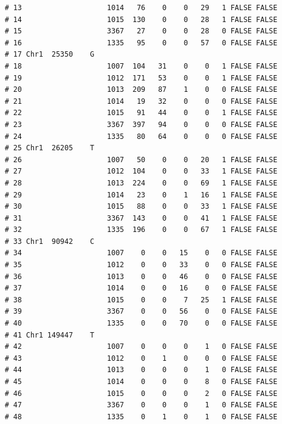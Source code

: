 \documentclass{article}\usepackage[]{graphicx}\usepackage[]{color}
\makeatletter
\newenvironment{kframe}{%
 \def\at@end@of@kframe{}%
 \ifinner\ifhmode%
  \def\at@end@of@kframe{\end{minipage}}%
  \begin{minipage}{\columnwidth}%
 \fi\fi%
 \def\FrameCommand##1{\hskip\@totalleftmargin \hskip-\fboxsep
 \colorbox{shadecolor}{##1}\hskip-\fboxsep
     \hskip-\linewidth \hskip-\@totalleftmargin \hskip\columnwidth}%
 \MakeFramed {\advance\hsize-\width
   \@totalleftmargin\z@ \linewidth\hsize
   \@setminipage}}%
 {\par\unskip\endMakeFramed%
 \at@end@of@kframe}
\newenvironment{knitrout}{}{} %
\makeatother
\begin{document}
\begin{knitrout}
\begin{kframe}
\begin{verbatim}
# 13                    1014   76    0    0   29   1 FALSE FALSE        
# 14                    1015  130    0    0   28   1 FALSE FALSE        
# 15                    3367   27    0    0   28   0 FALSE FALSE        
# 16                    1335   95    0    0   57   0 FALSE FALSE        
# 17 Chr1  25350    G                                                   
# 18                    1007  104   31    0    0   1 FALSE FALSE        
# 19                    1012  171   53    0    0   1 FALSE FALSE        
# 20                    1013  209   87    1    0   0 FALSE FALSE        
# 21                    1014   19   32    0    0   0 FALSE FALSE        
# 22                    1015   91   44    0    0   1 FALSE FALSE        
# 23                    3367  397   94    0    0   0 FALSE FALSE        
# 24                    1335   80   64    0    0   0 FALSE FALSE        
# 25 Chr1  26205    T                                                   
# 26                    1007   50    0    0   20   1 FALSE FALSE        
# 27                    1012  104    0    0   33   1 FALSE FALSE        
# 28                    1013  224    0    0   69   1 FALSE FALSE        
# 29                    1014   23    0    1   16   1 FALSE FALSE        
# 30                    1015   88    0    0   33   1 FALSE FALSE        
# 31                    3367  143    0    0   41   1 FALSE FALSE        
# 32                    1335  196    0    0   67   1 FALSE FALSE        
# 33 Chr1  90942    C                                                   
# 34                    1007    0    0   15    0   0 FALSE FALSE        
# 35                    1012    0    0   33    0   0 FALSE FALSE        
# 36                    1013    0    0   46    0   0 FALSE FALSE        
# 37                    1014    0    0   16    0   0 FALSE FALSE        
# 38                    1015    0    0    7   25   1 FALSE FALSE        
# 39                    3367    0    0   56    0   0 FALSE FALSE        
# 40                    1335    0    0   70    0   0 FALSE FALSE        
# 41 Chr1 149447    T                                                   
# 42                    1007    0    0    0    1   0 FALSE FALSE        
# 43                    1012    0    1    0    0   0 FALSE FALSE        
# 44                    1013    0    0    0    1   0 FALSE FALSE        
# 45                    1014    0    0    0    8   0 FALSE FALSE        
# 46                    1015    0    0    0    2   0 FALSE FALSE        
# 47                    3367    0    0    0    1   0 FALSE FALSE        
# 48                    1335    0    1    0    1   0 FALSE FALSE        

\end{verbatim}
\end{kframe}
\end{knitrout}
\end{document}
